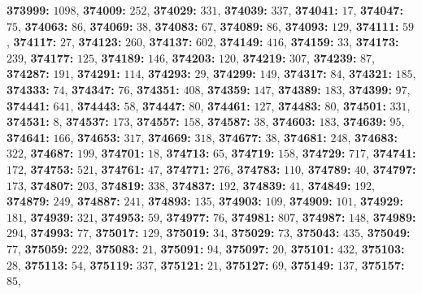 \textsf{\bfseries 373999:} $1098$, \textsf{\bfseries 374009:} $252$, \textsf{\bfseries 374029:} $331$, \textsf{\bfseries 374039:} $337$, \textsf{\bfseries 374041:} $17$, \textsf{\bfseries 374047:} $75$, \textsf{\bfseries 374063:} $86$, \textsf{\bfseries 374069:} $38$, \textsf{\bfseries 374083:} $67$, \textsf{\bfseries 374089:} $86$, \textsf{\bfseries 374093:} $129$, \textsf{\bfseries 374111:} $59$, \textsf{\bfseries 374117:} $27$, \textsf{\bfseries 374123:} $260$, \textsf{\bfseries 374137:} $602$, \textsf{\bfseries 374149:} $416$, \textsf{\bfseries 374159:} $33$, \textsf{\bfseries 374173:} $239$, \textsf{\bfseries 374177:} $125$, \textsf{\bfseries 374189:} $146$, \textsf{\bfseries 374203:} $120$, \textsf{\bfseries 374219:} $307$, \textsf{\bfseries 374239:} $87$, \textsf{\bfseries 374287:} $191$, \textsf{\bfseries 374291:} $114$, \textsf{\bfseries 374293:} $29$, \textsf{\bfseries 374299:} $149$, \textsf{\bfseries 374317:} $84$, \textsf{\bfseries 374321:} $185$, \textsf{\bfseries 374333:} $74$, \textsf{\bfseries 374347:} $76$, \textsf{\bfseries 374351:} $408$, \textsf{\bfseries 374359:} $147$, \textsf{\bfseries 374389:} $183$, \textsf{\bfseries 374399:} $97$, \textsf{\bfseries 374441:} $641$, \textsf{\bfseries 374443:} $58$, \textsf{\bfseries 374447:} $80$, \textsf{\bfseries 374461:} $127$, \textsf{\bfseries 374483:} $80$, \textsf{\bfseries 374501:} $331$, \textsf{\bfseries 374531:} $8$, \textsf{\bfseries 374537:} $173$, \textsf{\bfseries 374557:} $158$, \textsf{\bfseries 374587:} $38$, \textsf{\bfseries 374603:} $183$, \textsf{\bfseries 374639:} $95$, \textsf{\bfseries 374641:} $166$, \textsf{\bfseries 374653:} $317$, \textsf{\bfseries 374669:} $318$, \textsf{\bfseries 374677:} $38$, \textsf{\bfseries 374681:} $248$, \textsf{\bfseries 374683:} $322$, \textsf{\bfseries 374687:} $199$, \textsf{\bfseries 374701:} $18$, \textsf{\bfseries 374713:} $65$, \textsf{\bfseries 374719:} $158$, \textsf{\bfseries 374729:} $717$, \textsf{\bfseries 374741:} $172$, \textsf{\bfseries 374753:} $521$, \textsf{\bfseries 374761:} $47$, \textsf{\bfseries 374771:} $276$, \textsf{\bfseries 374783:} $110$, \textsf{\bfseries 374789:} $40$, \textsf{\bfseries 374797:} $173$, \textsf{\bfseries 374807:} $203$, \textsf{\bfseries 374819:} $338$, \textsf{\bfseries 374837:} $192$, \textsf{\bfseries 374839:} $41$, \textsf{\bfseries 374849:} $192$, \textsf{\bfseries 374879:} $249$, \textsf{\bfseries 374887:} $241$, \textsf{\bfseries 374893:} $135$, \textsf{\bfseries 374903:} $109$, \textsf{\bfseries 374909:} $101$, \textsf{\bfseries 374929:} $181$, \textsf{\bfseries 374939:} $321$, \textsf{\bfseries 374953:} $59$, \textsf{\bfseries 374977:} $76$, \textsf{\bfseries 374981:} $807$, \textsf{\bfseries 374987:} $148$, \textsf{\bfseries 374989:} $294$, \textsf{\bfseries 374993:} $77$, \textsf{\bfseries 375017:} $129$, \textsf{\bfseries 375019:} $34$, \textsf{\bfseries 375029:} $73$, \textsf{\bfseries 375043:} $435$, \textsf{\bfseries 375049:} $77$, \textsf{\bfseries 375059:} $222$, \textsf{\bfseries 375083:} $21$, \textsf{\bfseries 375091:} $94$, \textsf{\bfseries 375097:} $20$, \textsf{\bfseries 375101:} $432$, \textsf{\bfseries 375103:} $28$, \textsf{\bfseries 375113:} $54$, \textsf{\bfseries 375119:} $337$, \textsf{\bfseries 375121:} $21$, \textsf{\bfseries 375127:} $69$, \textsf{\bfseries 375149:} $137$, \textsf{\bfseries 375157:} $85$, 
